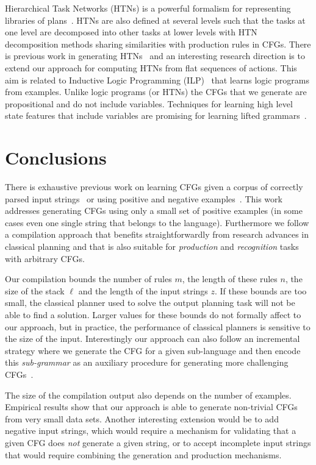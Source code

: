 \documentclass[letterpaper]{article} %
\begin{document}
Hierarchical Task Networks (HTNs) is a powerful formalism for representing libraries of plans~\cite{nau2003shop2}. HTNs are also defined at several levels such that the tasks at one level are decomposed into other tasks at lower levels with HTN decomposition methods sharing similarities with production rules in CFGs. There is previous work in generating HTNs~\cite{hogg2008htn,conf:ecai:Lotinac16} and an interesting research direction is to extend our approach for computing HTNs from flat sequences of actions. This aim is related to Inductive Logic Programming (ILP)~\cite{muggleton1999inductive} that learns logic programs from examples. Unlike logic programs (or HTNs) the CFGs that we generate are propositional and do not include variables. Techniques for learning high level state features that include variables are promising for learning lifted grammars~\cite{damir-derived-ijcai16}.


\section{Conclusions}
There is exhaustive previous work on learning CFGs given a corpus of correctly parsed input strings~\cite{sakakibara1992efficient,langley2000learning} or using positive and negative examples~\cite{de2010grammatical,muggleton2014meta}. This work addresses generating CFGs using only a small set of positive examples (in some cases even one single string that belongs to the language). Furthermore we follow a compilation approach that benefits straightforwardly from research advances in classical planning and that is also suitable for {\it production} and {\it recognition} tasks with arbitrary CFGs.

Our compilation bounds the number of rules $m$, the length of these rules $n$, the size of the stack $\ell$ and the length of the input strings $z$. If these bounds are too small, the classical planner used to solve the output planning task will not be able to find a solution. Larger values for these bounds do not formally affect to our approach, but in practice, the performance of classical planners is sensitive to the size of the input. Interestingly our approach can also follow an incremental strategy where we generate the CFG for a given sub-language and then encode this {\it sub-grammar} as an auxiliary procedure for generating more challenging CFGs~\cite{segovia2016hierarchical}. 

The size of the compilation output also depends on the number of examples. Empirical results show that our approach is able to generate non-trivial CFGs from very small data sets. Another interesting extension would be to add negative input strings, which would require a mechanism for validating that a given CFG does {\em not} generate a given string, or to accept incomplete input strings that would require combining the generation and production mechanisms.









\end{document}
